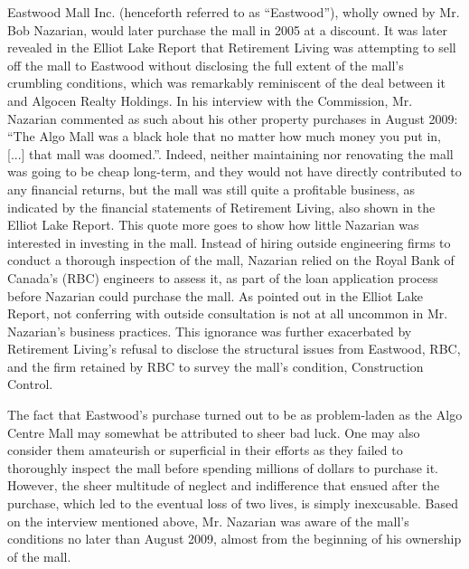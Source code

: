 \documentclass[12pt]{article}
\begin{document}
Eastwood Mall Inc. (henceforth referred to as ``Eastwood''), wholly owned by Mr. Bob Nazarian, would later purchase the mall in 2005 at a discount. It was later revealed in the Elliot Lake Report that Retirement Living was attempting to sell off the mall to Eastwood without disclosing the full extent of the mall's crumbling conditions, which was remarkably reminiscent of the deal between it and Algocen Realty Holdings. In his interview with the Commission, Mr. Nazarian commented as such about his other property purchases in August 2009: ``The Algo Mall was a black hole that no matter how much money you put in, [...] that mall was doomed.''\cite{AlgoLakeReport1}. Indeed, neither maintaining nor renovating the mall was going to be cheap long-term, and they would not have directly contributed to any financial returns, but the mall was still quite a profitable business, as indicated by the financial statements of Retirement Living, also shown in the Elliot Lake Report. This quote more goes to show how little Nazarian was interested in investing in the mall. Instead of hiring outside engineering firms to conduct a thorough inspection of the mall, Nazarian relied on the Royal Bank of Canada's (RBC) engineers to assess it, as part of the loan application process before Nazarian could purchase the mall. As pointed out in the Elliot Lake Report, not conferring with outside consultation is not at all uncommon in Mr. Nazarian's business practices. This ignorance was further exacerbated by Retirement Living's refusal to disclose the structural issues from Eastwood, RBC, and the firm retained by RBC to survey the mall's condition, Construction Control. 

The fact that Eastwood's purchase turned out to be as problem-laden as the Algo Centre Mall may somewhat be attributed to sheer bad luck. One may also consider them amateurish or superficial in their efforts as they failed to thoroughly inspect the mall before spending millions of dollars to purchase it. However, the sheer multitude of neglect and indifference that ensued after the purchase, which led to the eventual loss of two lives, is simply inexcusable. Based on the interview mentioned above, Mr. Nazarian was aware of the mall's conditions no later than August 2009, almost from the beginning of his ownership of the mall. 

\end{document}
